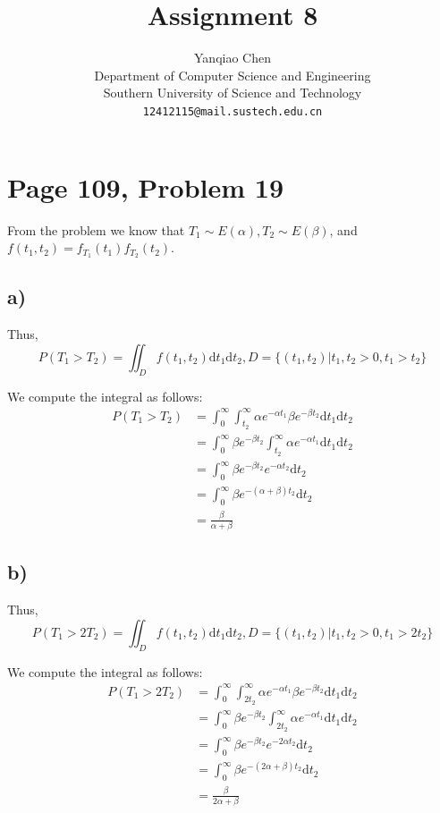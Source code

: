 \documentclass[a4paper, UTF-8]{article}
\theoremstyle{plain}
\begin{document}
\title{Assignment 8}

\author{Yanqiao Chen\\ 
  Department of Computer Science and Engineering\\
  Southern University of Science and Technology\\
  \texttt{12412115@mail.sustech.edu.cn}
  }


\maketitle

\section{Page 109, Problem 19}

From the problem we know that $T_1 \sim E(\alpha), T_2 \sim E(\beta)$, and $f(t_1,t_2) = f_{T_1}(t_1)f_{T_2}(t_2)$. 

\subsection{a)} 

Thus, 
$$
P(T_1 > T_2) = \iint_{D} f(t_1, t_2) \mathrm{d}t_1 \mathrm{d}t_2, D = \{(t_1, t_2)|t_1, t_2 > 0, t_1 > t_2\}
$$

We compute the integral as follows: 
\begin{align*} 
P(T_1 > T_2) &= \int_0^{\infty} \int_{t_2}^{\infty} \alpha e^{-\alpha t_1} \beta e^{-\beta t_2} \mathrm{d}t_1 \mathrm{d}t_2\\
&= \int_0^{\infty} \beta e^{-\beta t_2} \int_{t_2}^{\infty} \alpha e^{-\alpha t_1} \mathrm{d}t_1 \mathrm{d}t_2\\
&= \int_0^{\infty} \beta e^{-\beta t_2} e^{-\alpha t_2} \mathrm{d}t_2\\
&= \int_0^{\infty} \beta e^{-(\alpha + \beta) t_2} \mathrm{d}t_2\\
&= \frac{\beta}{\alpha + \beta}
\end{align*}

\subsection{b)} 

Thus, 
$$
P(T_1 > 2T_2) = \iint_{D} f(t_1, t_2) \mathrm{d}t_1 \mathrm{d}t_2, D = \{(t_1, t_2)|t_1, t_2 > 0, t_1 > 2t_2\}
$$

We compute the integral as follows:
\begin{align*}
P(T_1 > 2T_2) &= \int_0^{\infty} \int_{2t_2}^{\infty} \alpha e^{-\alpha t_1} \beta e^{-\beta t_2} \mathrm{d}t_1 \mathrm{d}t_2\\
&= \int_0^{\infty} \beta e^{-\beta t_2} \int_{2t_2}^{\infty} \alpha e^{-\alpha t_1} \mathrm{d}t_1 \mathrm{d}t_2\\
&= \int_0^{\infty} \beta e^{-\beta t_2} e^{-2\alpha t_2} \mathrm{d}t_2\\
&= \int_0^{\infty} \beta e^{-(2\alpha + \beta) t_2} \mathrm{d}t_2\\
&= \frac{\beta}{2\alpha + \beta}
\end{align*}
\end{document}

